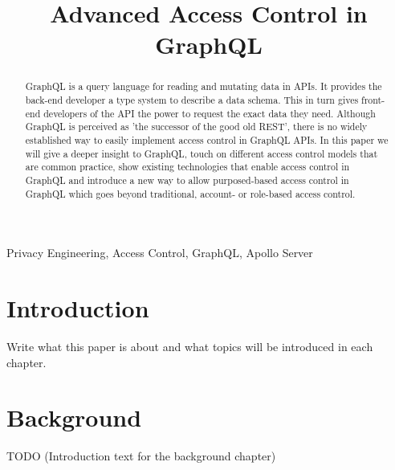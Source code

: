 \documentclass[conference]{IEEEtran}
\begin{document}
\title{Advanced Access Control in GraphQL\\}

\author{
\and
{}
\and
{}
}

\maketitle

\begin{abstract}
GraphQL is a query language for reading and mutating data in APIs. It provides the back-end developer a type system to describe a data schema. This in turn gives front-end developers of the API the power to request the exact data they need. Although GraphQL is perceived as 'the successor of the good old REST', there is no widely established way to easily implement access control in GraphQL APIs. In this paper we will give a deeper insight to GraphQL, touch on different access control models that are common practice, show existing technologies that enable access control in GraphQL and introduce a new way to allow purposed-based access control in GraphQL which goes beyond traditional, account- or role-based access control.

\end{abstract}

\begin{IEEEkeywords}
Privacy Engineering, Access Control, GraphQL, Apollo Server
\end{IEEEkeywords}

\section{Introduction}\label{intro}
Write what this paper is about and what topics will be introduced in each chapter.

\section{Background}\label{basic}

TODO (Introduction text for the background chapter)
\end{document}
